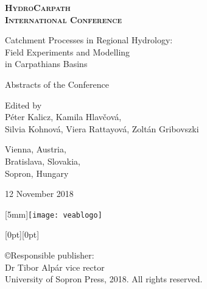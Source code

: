 \documentclass[10pt,a5paper,twoside]{book}
\begin{document}
\newcommand{\abstrtitle}[1]{\Large \textbf{\textsc{#1}}\normalsize \smallskip}
\newcommand{\name}[1]{\textbf{\textsc{#1}}\smallskip}
\newcommand{\institute}[1]{\footnotesize #1}
\newcommand{\email}[1]{\texttt{#1}\normalsize}

\begin{titlepage}
\centering
\scshape
\large
\bfseries
HydroCarpath \\
International Conference

\vspace{0.5cm}
Catchment Processes in Regional Hydrology:\\
Field Experiments and Modelling\\
in Carpathians Basins
\upshape
\normalsize
\mdseries

\vspace{1cm}
Abstracts of the Conference

\vspace{3cm}
Edited by\\
Péter Kalicz, Kamila Hlavčová,\\
Silvia Kohnová, Viera Rattayová, Zoltán Gribovszki


\vfill
Vienna, Austria, \\
Bratislava, Slovakia, \\
Sopron, Hungary

12 November 2018
\end{titlepage}

\newpage{}
\thispagestyle{empty}
\hspace*{\fill} \hspace{4mm} \raisebox{-11mm}[5mm]{\texttt{[image: veablogo]}}


\vspace*{\fill}

\hspace*{\fill} \hspace{1mm} \raisebox{0mm}[0pt][0pt]{}

\noindent{}\copyright{\footnotesize{}Responsible publisher:\\ Dr Tibor Alpár vice rector\\ University of Sopron Press, 2018. All rights reserved.} %
\end{document}
